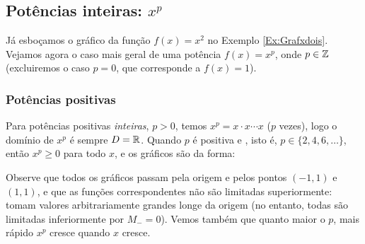 \subsection{Potências inteiras: $x^p$}\label{Sec:GraficosPotencias}
 Já esboçamos o gráfico da função $f(x)=x^2$ no Exemplo \ref{Ex:Grafxdois}. Vejamos agora
o caso mais geral de uma potência $f(x)=x^p$, onde $p\in \mathbb{Z}$ (excluiremos o caso $p=0$,
que corresponde a $f(x)=1$). 

\subsubsection{Potências positivas}
Para potências positivas \emph{inteiras}, $p>0$, temos $x^p=x\cdot x\cdots x$ ($p$ vezes),
logo o domínio de $x^p$ é sempre $D=\mathbb{R}$.
Quando $p$ é positiva e , isto é, $p\in \{ 2,4,6, \dots\}$, então 
$x^p\geq 0$ para todo $x$, e os gráficos são da forma:
\begin{center}
\begin{bmlimage}\end{bmlimage}
\end{center}
 Observe que todos os gráficos passam pela origem e pelos pontos 
 $(-1,1)$ e $(1,1)$, e que as funções correspondentes não são 
 limitadas superiormente: tomam 
valores arbitrariamente grandes longe da 
origem (no entanto, todas são limitadas inferiormente por $M_-=0$). 
Vemos
também que quanto maior o $p$, mais rápido $x^p$ cresce quando $x$
cresce.\\


